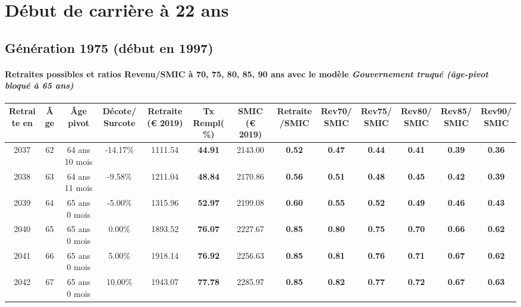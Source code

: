  \addto{\captionsenglish}{ \renewcommand{\mtctitle}{}} \setcounter{minitocdepth}{2} 
 \minitoc \newpage 

\section{Début de carrière à 22 ans} 

\subsection{Génération 1975 (début en 1997)} 

\paragraph{Retraites possibles et ratios Revenu/SMIC à 70, 75, 80, 85, 90 ans avec le modèle \emph{Gouvernement truqué (âge-pivot bloqué à 65 ans)}}  
 
{ \scriptsize \begin{center} 
\begin{tabular}[htb]{|c|c||c|c||c|c||c||c|c|c|c|c|c|} 
\hline 
 Retraite en &  Âge &  Âge pivot &  Décote/Surcote &  Retraite (\euro{} 2019) &  Tx Rempl(\%) &  SMIC (\euro{} 2019) &  Retraite/SMIC &  Rev70/SMIC &  Rev75/SMIC &  Rev80/SMIC &  Rev85/SMIC &  Rev90/SMIC \\ 
\hline \hline 
 2037 &  62 &  64 ans 10 mois &  -14.17\% &  1111.54 &  {\bf 44.91} &  2143.00 &  {\bf {\color{red} 0.52}} &  {\bf {\color{red} 0.47}} &  {\bf {\color{red} 0.44}} &  {\bf {\color{red} 0.41}} &  {\bf {\color{red} 0.39}} &  {\bf {\color{red} 0.36}} \\ 
\hline 
 2038 &  63 &  64 ans 11 mois &  -9.58\% &  1211.04 &  {\bf 48.84} &  2170.86 &  {\bf {\color{red} 0.56}} &  {\bf {\color{red} 0.51}} &  {\bf {\color{red} 0.48}} &  {\bf {\color{red} 0.45}} &  {\bf {\color{red} 0.42}} &  {\bf {\color{red} 0.39}} \\ 
\hline 
 2039 &  64 &  65 ans 0 mois &  -5.00\% &  1315.96 &  {\bf 52.97} &  2199.08 &  {\bf {\color{red} 0.60}} &  {\bf {\color{red} 0.55}} &  {\bf {\color{red} 0.52}} &  {\bf {\color{red} 0.49}} &  {\bf {\color{red} 0.46}} &  {\bf {\color{red} 0.43}} \\ 
\hline 
 2040 &  65 &  65 ans 0 mois &  0.00\% &  1893.52 &  {\bf 76.07} &  2227.67 &  {\bf {\color{red} 0.85}} &  {\bf {\color{red} 0.80}} &  {\bf {\color{red} 0.75}} &  {\bf {\color{red} 0.70}} &  {\bf {\color{red} 0.66}} &  {\bf {\color{red} 0.62}} \\ 
\hline 
 2041 &  66 &  65 ans 0 mois &  5.00\% &  1918.14 &  {\bf 76.92} &  2256.63 &  {\bf {\color{red} 0.85}} &  {\bf {\color{red} 0.81}} &  {\bf {\color{red} 0.76}} &  {\bf {\color{red} 0.71}} &  {\bf {\color{red} 0.67}} &  {\bf {\color{red} 0.62}} \\ 
\hline 
 2042 &  67 &  65 ans 0 mois &  10.00\% &  1943.07 &  {\bf 77.78} &  2285.97 &  {\bf {\color{red} 0.85}} &  {\bf {\color{red} 0.82}} &  {\bf {\color{red} 0.77}} &  {\bf {\color{red} 0.72}} &  {\bf {\color{red} 0.67}} &  {\bf {\color{red} 0.63}} \\ 
\hline 
\hline 
\end{tabular} 
\end{center} } 
